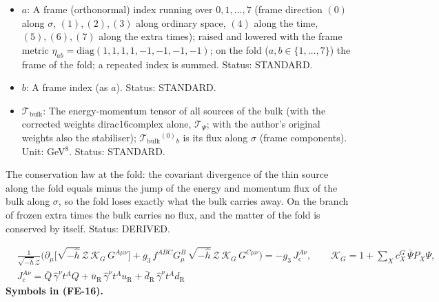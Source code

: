 \documentclass[
  10pt,
]{article}
\begin{document}
\begin{itemize}
  (FD-11, the junction conditions); \(\mathcal{S}^4{}_4\) is minus its
  energy density, \(\mathcal{S}^1{}_1\) and \(\mathcal{S}^5{}_5\) its
  pressures along ordinary space and along the extra times (frame
  components along the fold, eight-dimensional normalisation: an energy
  per unit volume of the six other directions of the fold). Unit:
  GeV\(^7\). Value:
  \(\kappa\mathcal{S}^a{}_b = -\frac{32}{5}H\delta^a{}_b\) at the static
  block. Status: DERIVED.
\item
  \(a\): A frame (orthonormal) index running over \(0, 1, \dots, 7\)
  (frame direction \((0)\) along \(\sigma\), \((1), (2), (3)\) along
  ordinary space, \((4)\) along the time, \((5), (6), (7)\) along the
  extra times); raised and lowered with the frame metric
  \(\eta_{ab} = \mathrm{diag}(1, 1, 1, 1, -1, -1, -1, -1)\); on the fold
  (\(a, b \in \{1, \dots, 7\}\)) the frame of the fold; a repeated index
  is summed. Status: STANDARD.
\item
  \(b\): A frame index (as \(a\)). Status: STANDARD.
\item
  \(\mathcal{T}_{\mathrm{bulk}}\): The energy-momentum tensor of all
  sources of the bulk (with the corrected weights dirac16complex alone,
  \(\mathcal{T}_\Psi\); with the author's original weights also the
  stabiliser); \(\mathcal{T}_{\mathrm{bulk}}{}^{(0)}{}_b\) is its flux
  along \(\sigma\) (frame components). Unit: GeV\(^8\). Status:
  STANDARD.
\end{itemize}

The conservation law at the fold: the covariant divergence of the thin
source along the fold equals minus the jump of the energy and momentum
flux of the bulk along \(\sigma\), so the fold loses exactly what the
bulk carries away. On the branch of frozen extra times the bulk carries
no flux, and the matter of the fold is conserved by itself. Status:
DERIVED.

\[
\begin{aligned}
&\frac{1}{\sqrt{-\hat h}\,\mathcal{Z}}\Big(\partial_\mu\big[\sqrt{-\hat h}\,\mathcal{Z}\,\mathcal{K}_{G}\,G^{A\mu\nu}\big]
 + g_3\,f^{ABC}G^B_\mu\,\sqrt{-\hat h}\,\mathcal{Z}\,\mathcal{K}_{G}\,G^{C\mu\nu}\Big) = -g_3\,J_{\mathrm{c}}^{A\nu},\qquad
 \mathcal{K}_{G} = 1 + \sum_X c^{G}_X\,\bar\Psi P_X\Psi,\\
&J_{\mathrm{c}}^{A\nu} = \bar Q\,\hat\gamma^\nu t^AQ + \bar u_{\mathrm{R}}\,\hat\gamma^\nu t^Au_{\mathrm{R}}
 + \bar d_{\mathrm{R}}\,\hat\gamma^\nu t^Ad_{\mathrm{R}}
\end{aligned} \tag{FE-16}
\] \textbf{Symbols in (FE-16).}
\end{document}
